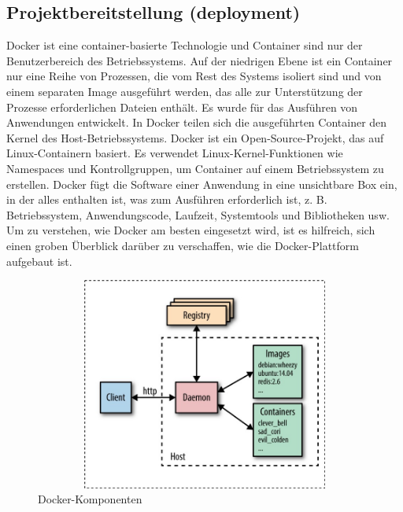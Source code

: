 \documentclass[a4paper,12pt,oneside]{book}
\begin{document}
\subsection{Projektbereitstellung (deployment)}
Docker ist eine container-basierte Technologie und Container sind nur der Benutzerbereich des Betriebssystems. Auf der niedrigen Ebene ist ein Container nur eine Reihe von Prozessen, die vom Rest des Systems isoliert sind und von einem separaten Image ausgeführt werden, das alle zur Unterstützung der Prozesse erforderlichen Dateien enthält. Es wurde für das Ausführen von Anwendungen entwickelt. In Docker teilen sich die ausgeführten Container den Kernel des Host-Betriebssystems. Docker ist ein Open-Source-Projekt, das auf Linux-Containern basiert. Es verwendet Linux-Kernel-Funktionen wie Namespaces und Kontrollgruppen, um Container auf einem Betriebssystem zu erstellen. Docker fügt die Software einer Anwendung in eine unsichtbare Box ein, in der alles enthalten ist, was zum Ausführen erforderlich ist, z. B. Betriebssystem, Anwendungscode, Laufzeit, Systemtools und Bibliotheken usw.
\newline
Um zu verstehen, wie Docker am besten eingesetzt wird, ist es hilfreich, sich einen groben Überblick darüber zu verschaffen, wie die Docker-Plattform aufgebaut ist.
\begin{figure}[h!]
	\begin{center}
		\includegraphics[width=13cm, height=7cm]{Docker-components.jpg}
		\caption{Docker-Komponenten} 
		\label{Docker-Komponenten} 
	\end{center}
\end{figure}
\end{document}
